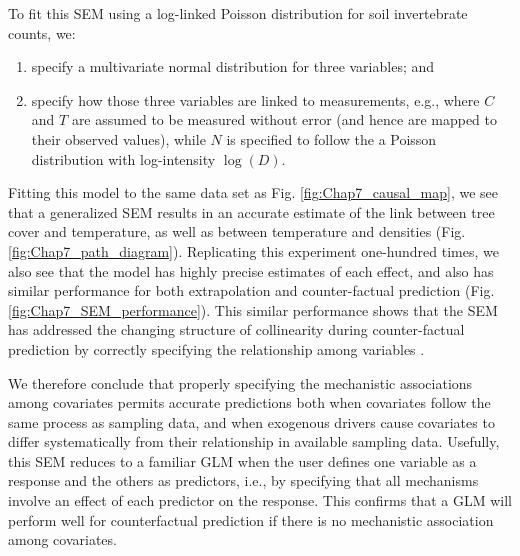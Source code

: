 To fit this SEM using a log-linked Poisson distribution for soil invertebrate counts, we:
\begin{enumerate}
    \item specify a multivariate normal distribution for three variables; and 

    \item specify how those three variables are linked to measurements, e.g., where \(C\) and \(T\) are assumed to be measured without error (and hence are mapped to their observed values), while \(N\) is specified to follow the a Poisson distribution with log-intensity \(\log(D)\). 
\end{enumerate}
Fitting this model to the same data set as Fig. \ref{fig:Chap7_causal_map}, we see that a generalized SEM results in an accurate estimate of the link between tree cover and temperature, as well as between temperature and densities (Fig. \ref{fig:Chap7_path_diagram}).  Replicating this experiment one-hundred times, we also see that the model has highly precise estimates of each effect, and also has similar performance for both extrapolation and counter-factual prediction (Fig. \ref{fig:Chap7_SEM_performance}).  This similar performance shows that the SEM has addressed the changing structure of collinearity during counter-factual prediction by correctly specifying the relationship among variables \cite{dormann_collinearity_2013}.

We therefore conclude that properly specifying the mechanistic associations among covariates permits accurate predictions both when covariates follow the same process as sampling data, and when exogenous drivers cause covariates to differ systematically from their relationship in available sampling data.  Usefully, this SEM reduces to a familiar GLM when the user defines one variable as a response and the others as predictors, i.e., by specifying that all mechanisms involve an effect of each predictor on the response.  This confirms that a GLM will perform well for counterfactual prediction if there is no mechanistic association among covariates.  

